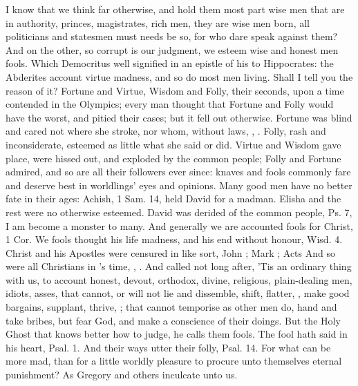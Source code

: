 {I know that we think far otherwise, and hold them most part wise men
that are in authority, princes, magistrates, rich men, they are
wise men born, all politicians and statesmen must needs be so, for who
dare speak against them? And on the other, so corrupt is our judgment,
we esteem wise and honest men fools. Which Democritus well signified in
an epistle of his to Hippocrates: the Abderites account virtue
madness, and so do most men living. Shall I tell you the reason of it?
Fortune and Virtue, Wisdom and Folly, their seconds, upon a time
contended in the Olympics; every man thought that Fortune and Folly
would have the worst, and pitied their cases; but it fell out
otherwise. Fortune was blind and cared not where she stroke, nor whom,
without laws, , \etc. Folly, rash and inconsiderate,
esteemed as little what she said or did. Virtue and Wisdom gave
place, were hissed out, and exploded by the common people; Folly
and Fortune admired, and so are all their followers ever since: knaves
and fools commonly fare and deserve best in worldlings' eyes and
opinions. Many good men have no better fate in their ages: Achish, 1
Sam.  14, held David for a madman. Elisha and the rest were no
otherwise esteemed. David was derided of the common people, Ps.  7,
I am become a monster to many. And generally we are accounted fools for
Christ, 1 Cor.  We fools thought his life madness, and his end
without honour, Wisd.  4. Christ and his Apostles were censured in
like sort, John ; Mark ; Acts  And so were all Christians in
\Pliny{}'s time, , \etc. And called
not long after,  'Tis an ordinary thing with us, to account honest, devout,
orthodox, divine, religious, plain-dealing men, idiots, asses, that
cannot, or will not lie and dissemble, shift, flatter, , make good bargains, supplant, thrive,
; that cannot temporise as other men do, hand
and take bribes, \etc but fear God, and make a conscience of their
doings. But the Holy Ghost that knows better how to judge, he calls
them fools. The fool hath said in his heart, Psal.  1. And their
ways utter their folly, Psal.  14. For what can be more mad,
than for a little worldly pleasure to procure unto themselves eternal
punishment? As Gregory and others inculcate unto us.

}
